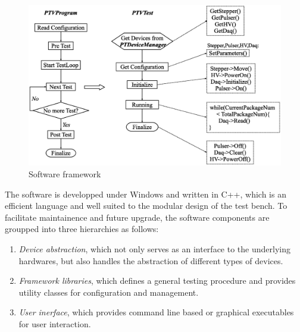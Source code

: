 \documentclass[5p, times]{elsarticle}
\begin{document}
\begin{figure}
\centering
 \includegraphics[width=140mm]{software_framework}
\caption{Software framework}
\label{fig:software_framework}
\end{figure}

The software is developped under Windows and written in C++, which is an efficient language and well suited to the modular design of the test bench.
To facilitate maintainence and future upgrade, the software components are groupped into three hierarchies as follows:
\begin{enumerate}
 \item \textit{Device abstraction}, which not only serves as an interface to the underlying hardwares, but also handles the abstraction of different types of devices. 
 \item \textit{Framework libraries}, which defines a general testing procedure and provides utility classes for configuration and management.
 \item \textit{User inerface}, which provides command line based or graphical executables for user interaction. 
\end{enumerate}
\end{document}
